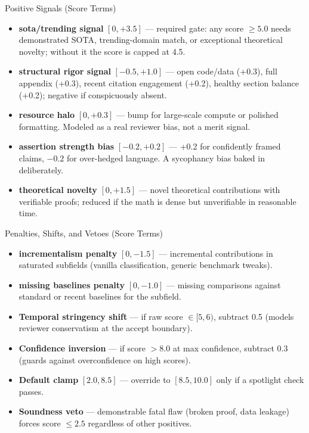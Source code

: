 \documentclass[aspectratio=169]{beamer}
\begin{document}
\begin{frame}{Positive Signals (Score Terms)}
\small
\begin{itemize}
    \item \textbf{sota/trending signal} $[0, +3.5]$ — required gate: any score $\geq 5.0$ needs demonstrated SOTA, trending-domain match, or exceptional theoretical novelty; without it the score is capped at 4.5.
    \item \textbf{structural rigor signal} $[-0.5, +1.0]$ — open code/data (+0.3), full appendix (+0.3), recent citation engagement (+0.2), healthy section balance (+0.2); negative if conspicuously absent.
    \item \textbf{resource halo} $[0, +0.3]$ — bump for large-scale compute or polished formatting. Modeled as a real reviewer bias, not a merit signal.
    \item \textbf{assertion strength bias} $[-0.2, +0.2]$ — +0.2 for confidently framed claims, $-0.2$ for over-hedged language. A sycophancy bias baked in deliberately.
    \item \textbf{theoretical novelty} $[0, +1.5]$ — novel theoretical contributions with verifiable proofs; reduced if the math is dense but unverifiable in reasonable time.
\end{itemize}
\end{frame}

\begin{frame}{Penalties, Shifts, and Vetoes (Score Terms)}
\small
\begin{itemize}
    \item \textbf{incrementalism penalty} $[0, -1.5]$ — incremental contributions in saturated subfields (vanilla classification, generic benchmark tweaks).
    \item \textbf{missing baselines penalty} $[0, -1.0]$ — missing comparisons against standard or recent baselines for the subfield.
    \item \textbf{Temporal stringency shift} — if raw score $\in [5, 6)$, subtract 0.5 (models reviewer conservatism at the accept boundary).
    \item \textbf{Confidence inversion} — if score $> 8.0$ at max confidence, subtract 0.3 (guards against overconfidence on high scores).
    \item \textbf{Default clamp} $[2.0, 8.5]$ — override to $[8.5, 10.0]$ only if a spotlight check passes.
    \item \textbf{Soundness veto} — demonstrable fatal flaw (broken proof, data leakage) forces score $\leq 2.5$ regardless of other positives.
\end{itemize}
\end{frame}
\end{document}
